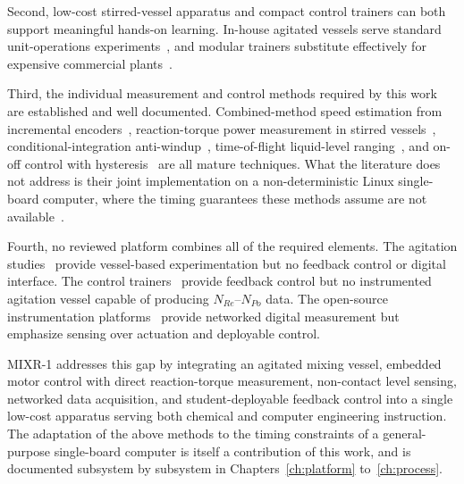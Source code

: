 Second, low-cost stirred-vessel apparatus and compact control trainers can both support meaningful hands-on learning. In-house agitated vessels serve standard unit-operations experiments~\citep{nassar2011,ganley2015}, and modular trainers substitute effectively for expensive commercial plants~\citep{plett2023,rehg1998fie,uyanik2018}.

Third, the individual measurement and control methods required by this work are established and well documented. Combined-method speed estimation from incremental encoders~\citep{ohmae1982,bonert1983,anuchin2019}, reaction-torque power measurement in stirred vessels~\citep{ascanio2004}, conditional-integration anti-windup~\citep{bohn1995}, time-of-flight liquid-level ranging~\citep{st2022an5851}, and on-off control with hysteresis~\citep{Boiko2013} are all mature techniques. What the literature does not address is their joint implementation on a non-deterministic Linux single-board computer, where the timing guarantees these methods assume are not available~\citep{adam2021computers,adam2021electronics}.

Fourth, no reviewed platform combines all of the required elements. The agitation studies~\citep{nassar2011,ganley2015,ascanio2004} provide vessel-based experimentation but no feedback control or digital interface. The control trainers~\citep{plett2023,rehg1998fie,uyanik2018} provide feedback control but no instrumented agitation vessel capable of producing $N_{Re}$--$N_{Po}$ data. The open-source instrumentation platforms~\citep{grinias2016,wejner2022,benatiro2023} provide networked digital measurement but emphasize sensing over actuation and deployable control.

MIXR-1 addresses this gap by integrating an agitated mixing vessel, embedded motor control with direct reaction-torque measurement, non-contact level sensing, networked data acquisition, and student-deployable feedback control into a single low-cost apparatus serving both chemical and computer engineering instruction. The adaptation of the above methods to the timing constraints of a general-purpose single-board computer is itself a contribution of this work, and is documented subsystem by subsystem in Chapters~\ref{ch:platform} to~\ref{ch:process}.